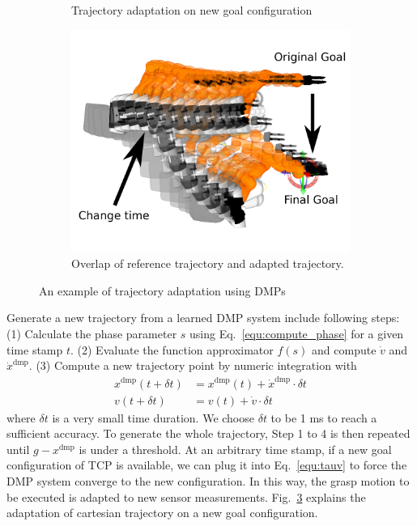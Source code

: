 \begin{figure}[!htbp]
\begin{subfigure}[t]{.3\linewidth}
  \caption{Trajectory adaptation on new goal configuration }
  \label{fig:sub2}
\end{subfigure}
\begin{subfigure}[t]{.3\linewidth}
  \centering
  \includegraphics[width=1\linewidth]{figure/dmpdmpchanged_explanation.png}
    \caption{Overlap of reference trajectory  and adapted trajectory.}
  \label{fig:sub3}
\end{subfigure}
\caption{An example of trajectory adaptation using DMPs}
\label{fig:dmp_example}
\end{figure}

Generate a new trajectory from a learned DMP system include following steps: (1) Calculate the phase parameter $s$ using Eq.~\ref{equ:compute_phase} for a  given time stamp $t$. (2) Evaluate the function approximator $f(s)$ and compute $\dot{v} $ and $\dot{x}^{\text{dmp}} $. (3) Compute a new trajectory point by 
numeric integration with 
 \begin{align}
x^{\text{dmp}} (t+\delta t) &= x^{\text{dmp}}(t) + \dot{x}^{\text{dmp}}  \cdot \delta t \\
v (t+\delta t)&= v(t) + \dot{v} \cdot \delta t
\label{equ:numeric_integration}
\end{align}
where $\delta t$ is a very small time duration. We choose $\delta t$ to be 1 ms to reach a sufficient accuracy. To generate the whole trajectory, Step 1 to 4 is then repeated until $g-x^{\text{dmp}}$ is under a threshold. At an arbitrary time stamp, if a new goal configuration of TCP is available, we can plug it into Eq.~\ref{equ:tauv} to force the DMP system converge to the new configuration. In this way, the grasp motion to be executed is adapted to new sensor measurements.      Fig.~\ref{fig:dmp_example} explains the adaptation of cartesian trajectory on a new goal configuration.


